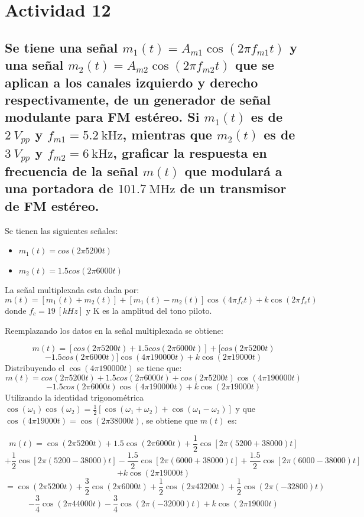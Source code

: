 \section{Actividad 12}

\subsection*{Se tiene una señal 
$
m_1(t) = A_{m1}\cos(2\pi f_{m1}t)
$
y una señal 
$
m_2(t) = A_{m2}\cos(2\pi f_{m2}t)
$
que se aplican a los canales izquierdo y derecho respectivamente, 
de un generador de señal modulante para FM estéreo.  
Si $m_1(t)$ es de $2~V_{pp}$ y $f_{m1} = 5.2~\text{kHz}$, mientras que 
$m_2(t)$ es de $3~V_{pp}$ y $f_{m2} = 6~\text{kHz}$, graficar la respuesta en frecuencia 
de la señal $m(t)$ que modulará a una portadora de $101.7~\text{MHz}$ 
de un transmisor de FM estéreo.}


Se tienen las siguientes señales:

\begin{itemize}
    \item $m_1(t) = cos(2\pi 5200t)$
    \item $m_2(t) = 1.5cos(2\pi 6000t)$
\end{itemize}

La señal multiplexada esta dada por:
    \[
        m(t) = [m_1(t) + m_2(t)] + [m_1(t) - m_2(t)] \cos(4 \pi f_c t) + k\cos(2 \pi f_c t) 
    \]
donde $f_c=19~[kHz]$ y K es la amplitud del tono piloto.\par

Reemplazando los datos en la  señal multiplexada se obtiene:

    \[
        m(t) = [cos(2\pi 5200t) + 1.5cos(2\pi 6000t)] + [cos(2\pi 5200t) 
    \]
    \[
     - 1.5cos(2\pi 6000t)] \cos(4 \pi 190000 t) + k\cos(2 \pi 19000 t) 
    \]
Distribuyendo el $\cos(4 \pi 190000 t)$ se tiene que:
    \[
        m(t) = cos(2\pi 5200t) + 1.5cos(2\pi 6000t) + cos(2\pi 5200t)\cos(4 \pi 190000 t)
    \]
    \[
        - 1.5cos(2\pi 6000t)\cos(4 \pi 190000 t) + k\cos(2 \pi 19000 t) 
    \]
Utilizando la identidad trigonométrica $\cos(\omega_1)\cos(\omega_2) = \frac{1}{2}[\cos(\omega_1 + \omega_2) + \cos(\omega_1 - \omega_2)]$ y que $\cos(4\pi 19000t) = \cos(2\pi 38000t)$, se obtiene que $m(t)$ es:

    \[
        m(t) = \cos(2\pi 5200t) + 1.5\cos(2\pi 6000t) + \frac{1}{2}\cos[2\pi (5200 + 38000)t] 
    \]
    \[
        + \frac{1}{2}\cos[2\pi (5200 - 38000)t] - \frac{1.5}{2}\cos[2\pi (6000 + 38000)t] + \frac{1.5}{2}\cos[2\pi (6000 - 38000)t]
    \]
    \[
         + k\cos(2\pi 19000t)
    \]
    \[
        = \cos(2\pi 5200t) + \frac{3}{2}\cos(2\pi 6000t) + \frac{1}{2}\cos(2\pi 43200t) + \frac{1}{2}\cos(2\pi (-32800)t)
    \]
    \[
        - \frac{3}{4}\cos(2\pi 44000t) - \frac{3}{4}\cos(2\pi (-32000)t) + k\cos(2\pi 19000t)
    \]

